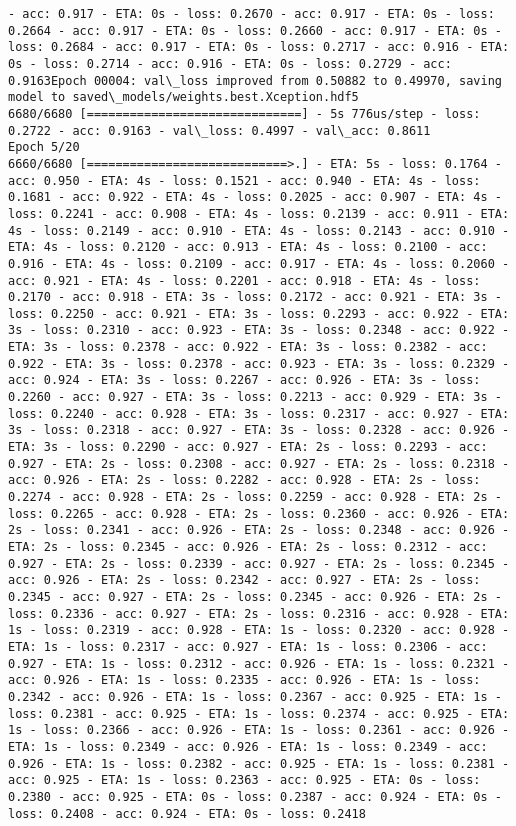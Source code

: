 \documentclass[11pt]{article}
\begin{document}
\begin{Verbatim}[commandchars=\\\{\}]
- acc: 0.917 - ETA: 0s - loss: 0.2670 - acc: 0.917 - ETA: 0s - loss: 0.2664 - acc: 0.917 - ETA: 0s - loss: 0.2660 - acc: 0.917 - ETA: 0s - loss: 0.2684 - acc: 0.917 - ETA: 0s - loss: 0.2717 - acc: 0.916 - ETA: 0s - loss: 0.2714 - acc: 0.916 - ETA: 0s - loss: 0.2729 - acc: 0.9163Epoch 00004: val\_loss improved from 0.50882 to 0.49970, saving model to saved\_models/weights.best.Xception.hdf5
6680/6680 [==============================] - 5s 776us/step - loss: 0.2722 - acc: 0.9163 - val\_loss: 0.4997 - val\_acc: 0.8611
Epoch 5/20
6660/6680 [============================>.] - ETA: 5s - loss: 0.1764 - acc: 0.950 - ETA: 4s - loss: 0.1521 - acc: 0.940 - ETA: 4s - loss: 0.1681 - acc: 0.922 - ETA: 4s - loss: 0.2025 - acc: 0.907 - ETA: 4s - loss: 0.2241 - acc: 0.908 - ETA: 4s - loss: 0.2139 - acc: 0.911 - ETA: 4s - loss: 0.2149 - acc: 0.910 - ETA: 4s - loss: 0.2143 - acc: 0.910 - ETA: 4s - loss: 0.2120 - acc: 0.913 - ETA: 4s - loss: 0.2100 - acc: 0.916 - ETA: 4s - loss: 0.2109 - acc: 0.917 - ETA: 4s - loss: 0.2060 - acc: 0.921 - ETA: 4s - loss: 0.2201 - acc: 0.918 - ETA: 4s - loss: 0.2170 - acc: 0.918 - ETA: 3s - loss: 0.2172 - acc: 0.921 - ETA: 3s - loss: 0.2250 - acc: 0.921 - ETA: 3s - loss: 0.2293 - acc: 0.922 - ETA: 3s - loss: 0.2310 - acc: 0.923 - ETA: 3s - loss: 0.2348 - acc: 0.922 - ETA: 3s - loss: 0.2378 - acc: 0.922 - ETA: 3s - loss: 0.2382 - acc: 0.922 - ETA: 3s - loss: 0.2378 - acc: 0.923 - ETA: 3s - loss: 0.2329 - acc: 0.924 - ETA: 3s - loss: 0.2267 - acc: 0.926 - ETA: 3s - loss: 0.2260 - acc: 0.927 - ETA: 3s - loss: 0.2213 - acc: 0.929 - ETA: 3s - loss: 0.2240 - acc: 0.928 - ETA: 3s - loss: 0.2317 - acc: 0.927 - ETA: 3s - loss: 0.2318 - acc: 0.927 - ETA: 3s - loss: 0.2328 - acc: 0.926 - ETA: 3s - loss: 0.2290 - acc: 0.927 - ETA: 2s - loss: 0.2293 - acc: 0.927 - ETA: 2s - loss: 0.2308 - acc: 0.927 - ETA: 2s - loss: 0.2318 - acc: 0.926 - ETA: 2s - loss: 0.2282 - acc: 0.928 - ETA: 2s - loss: 0.2274 - acc: 0.928 - ETA: 2s - loss: 0.2259 - acc: 0.928 - ETA: 2s - loss: 0.2265 - acc: 0.928 - ETA: 2s - loss: 0.2360 - acc: 0.926 - ETA: 2s - loss: 0.2341 - acc: 0.926 - ETA: 2s - loss: 0.2348 - acc: 0.926 - ETA: 2s - loss: 0.2345 - acc: 0.926 - ETA: 2s - loss: 0.2312 - acc: 0.927 - ETA: 2s - loss: 0.2339 - acc: 0.927 - ETA: 2s - loss: 0.2345 - acc: 0.926 - ETA: 2s - loss: 0.2342 - acc: 0.927 - ETA: 2s - loss: 0.2345 - acc: 0.927 - ETA: 2s - loss: 0.2345 - acc: 0.926 - ETA: 2s - loss: 0.2336 - acc: 0.927 - ETA: 2s - loss: 0.2316 - acc: 0.928 - ETA: 1s - loss: 0.2319 - acc: 0.928 - ETA: 1s - loss: 0.2320 - acc: 0.928 - ETA: 1s - loss: 0.2317 - acc: 0.927 - ETA: 1s - loss: 0.2306 - acc: 0.927 - ETA: 1s - loss: 0.2312 - acc: 0.926 - ETA: 1s - loss: 0.2321 - acc: 0.926 - ETA: 1s - loss: 0.2335 - acc: 0.926 - ETA: 1s - loss: 0.2342 - acc: 0.926 - ETA: 1s - loss: 0.2367 - acc: 0.925 - ETA: 1s - loss: 0.2381 - acc: 0.925 - ETA: 1s - loss: 0.2374 - acc: 0.925 - ETA: 1s - loss: 0.2366 - acc: 0.926 - ETA: 1s - loss: 0.2361 - acc: 0.926 - ETA: 1s - loss: 0.2349 - acc: 0.926 - ETA: 1s - loss: 0.2349 - acc: 0.926 - ETA: 1s - loss: 0.2382 - acc: 0.925 - ETA: 1s - loss: 0.2381 - acc: 0.925 - ETA: 1s - loss: 0.2363 - acc: 0.925 - ETA: 0s - loss: 0.2380 - acc: 0.925 - ETA: 0s - loss: 0.2387 - acc: 0.924 - ETA: 0s - loss: 0.2408 - acc: 0.924 - ETA: 0s - loss: 0.2418 
\end{Verbatim}
\end{document}
